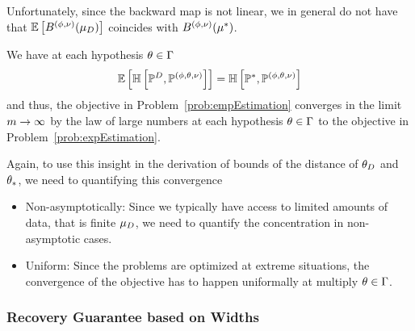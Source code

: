 Unfortunately, since the backward map is not linear, we in general do not have that $\mathbb{E}\left[B^{(\phi,\nu)}(\mu_{D})\right]$ coincides with $B^{(\phi,\nu)}(\mu^*)$.

We have at each hypothesis $\theta\in\Gamma$
\begin{align}
    \mathbb{E}\left[\mathbb{H}\left[\mathbb{P}^{D},\mathbb{P}^{(\phi,\theta,\nu)}\right]\right] = \mathbb{H}\left[\mathbb{P}^*,\mathbb{P}^{(\phi,\theta,\nu)}\right]
\end{align}
and thus, the objective in Problem~\ref{prob:empEstimation} converges in the limit $m\rightarrow\infty$ by the law of large numbers at each hypothesis $\theta\in\Gamma$ to the objective in Problem~\ref{prob:expEstimation}.

Again, to use this insight in the derivation of bounds of the distance of $\theta_{D}$ and $\theta_{*}$, we need to quantifying this convergence
\begin{itemize}
    \item Non-asymptotically: Since we typically have access to limited amounts of data, that is finite $\mu_{D}$, we need to quantify the concentration in non-asymptotic cases.
    \item Uniform: Since the problems are optimized at extreme situations, the convergence of the objective has to happen uniformally at multiply $\theta\in\Gamma$.
\end{itemize}

\subsubsection{Recovery Guarantee based on Widths}

